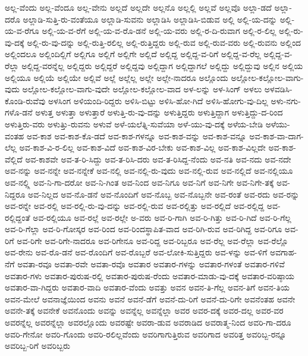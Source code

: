 {ಅಲ್ಲ-ವೆಂದು
ಅಲ್ಲ-ವೆಂದೂ
ಅಲ್ಲ-ವೇನು
ಅಲ್ಲದೆ
ಅಲ್ಲದೇ
ಅಲ್ಲನೊ
ಅಲ್ಲಲ್ಲಿ
ಅಲ್ಲವೆ
ಅಲ್ಲವೊ
ಅಲ್ಲಾ-ಡದೆ
ಅಲ್ಲಾ-ದರೊ
ಅಲ್ಲಾಡಿ-ಸುತ್ತಿ-ರು-ವಂತೆಯೂ
ಅಲ್ಲಾಡಿ-ಸುವನು
ಅಲ್ಲಾಡಿಸಿ
ಅಲ್ಲಾಡಿಸಿ-ಬಿಡುವ
ಅಲ್ಲಿ
ಅಲ್ಲಿ-ಯ-ದನ್ನು
ಅಲ್ಲಿ-ಯ-ವ-ರೆಗೂ
ಅಲ್ಲಿ-ಯ-ವ-ರೆಗೆ
ಅಲ್ಲಿ-ಯ-ವ-ರೊ-ಡನೆ
ಅಲ್ಲಿ-ಯ-ವರು
ಅಲ್ಲಿ-ರ-ದಿ-ರುವಾಗ
ಅಲ್ಲಿ-ರ-ಲಿಲ್ಲ
ಅಲ್ಲಿ-ರು-ವು-ದಕ್ಕೆ
ಅಲ್ಲಿ-ರು-ವು-ದನ್ನು
ಅಲ್ಲಿ-ರುತ್ತಿ-ರಲಿಲ್ಲ
ಅಲ್ಲಿ-ರುತ್ತಿದ್ದರು
ಅಲ್ಲಿ-ರುವ
ಅಲ್ಲಿ-ರುವ-ವರು
ಅಲ್ಲಿ-ರುವನು
ಅಲ್ಲಿಂದ
ಅಲ್ಲಿಂದಲೂ
ಅಲ್ಲಿಂದಿಲ್ಲಿಗೆ
ಅಲ್ಲಿಗೂ
ಅಲ್ಲಿಗೆ
ಅಲ್ಲಿಗೇ
ಅಲ್ಲಿದೆ
ಅಲ್ಲಿದ್ದ
ಅಲ್ಲಿದ್ದ-ವ-ರಿಗೆ
ಅಲ್ಲಿದ್ದ-ವ-ರೆಲ್ಲ
ಅಲ್ಲಿದ್ದ-ವ-ರೆಲ್ಲಾ
ಅಲ್ಲಿದ್ದ-ವರನ್ನೆಲ್ಲ
ಅಲ್ಲಿದ್ದರು
ಅಲ್ಲಿದ್ದರೆ
ಅಲ್ಲಿದ್ದವು
ಅಲ್ಲಿದ್ದಾಗ
ಅಲ್ಲಿದ್ದಾಗಲೆ
ಅಲ್ಲಿದ್ದು
ಅಲ್ಲಿದ್ದುವು
ಅಲ್ಲಿನ
ಅಲ್ಲಿಯ
ಅಲ್ಲಿಯೂ
ಅಲ್ಲಿಯೆ
ಅಲ್ಲಿಯೇ
ಅಲ್ಲಿವೆ
ಅಲ್ಲೆ
ಅಲ್ಲೆಲ್ಲ
ಅಲ್ಲೇ
ಅಲ್ಲೇ-ನಾದರೂ
ಅಲ್ಲೊಂದು
ಅಲ್ಲೋಲ-ಕಲ್ಲೋಲ-ವಾಗು-ವುದು
ಅಲ್ಲೋಲ-ಕಲ್ಲೋಲ-ವಾಗು-ವುದೇ
ಅಲ್ಲೋಲ-ಕಲ್ಲೋಲ-ವಾದ
ಅಳ-ಲನ್ನು
ಅಳ-ಸಿಂಗ್
ಅಳಲು
ಅಳವಡಿಸಿ-ಕೊಂಡಿ-ರುವೆವು
ಅಳಸಿಂಗ
ಅಳಿಯಂದಿ-ರಿದ್ದರು
ಅಳಿಸಿ-ಬಿಟ್ಟು
ಅಳಿಸಿ-ಹೋ-ಗಿದೆ
ಅಳಿಸಿ-ಹೋಗು-ವು-ದಿಲ್ಲ
ಅಳು-ನಗು-ಗಳೊ-ಡನೆ
ಅಳುತ್ತ
ಅಳುತ್ತಾ
ಅಳುತ್ತಾರೆ
ಅಳುತ್ತಿ-ರು-ವು-ದನ್ನು
ಅಳುತ್ತಿದ್ದರು
ಅಳುತ್ತಿದ್ದಾಗ
ಅಳುತ್ತಿದ್ದು-ದ-ರಿಂದ
ಅಳುತ್ತಿರು-ವರು
ಅಳುತ್ತಿು-ರುವನು
ಅಳುವೆ
ಅಳೆ-ಯಲೆತ್ನಿ-ಸುವೆಯಾ
ಅಳೆ-ಯು-ವು-ದಕ್ಕೆ
ಅಳೆಯ-ಬೇಡಿ
ಅಳೆಯು-ವಂತಹ
ಅವ-ಕಾಶ
ಅವ-ಕಾಶ-ಕೊ-ಡದೆ
ಅವ-ಕಾಶ-ಗಳನ್ನೂ
ಅವ-ಕಾಶ-ವನ್ನು
ಅವ-ಕಾಶ-ವನ್ನೂ
ಅವ-ಕಾಶ-ವಾ-ದಾಗ-ಲೆಲ್ಲ
ಅವ-ಕಾಶ-ವಿ-ರ-ಲಿಲ್ಲ
ಅವ-ಕಾಶ-ವಿದೆ
ಅವ-ಕಾಶ-ವಿರ-ಬೇಕು
ಅವ-ಕಾಶ-ವಿಲ್ಲ
ಅವ-ಕಾಶ-ವಿಲ್ಲದೇ
ಅವ-ಕಾಶ-ವೆಲ್ಲಿದೆ
ಅವ-ಕಾಶವೇ
ಅವ-ತ-ರಿ-ಸಿದ್ದು
ಅವ-ತ-ರಿಸಿ-ದರು
ಅವ-ತ-ರಿಸಿದ್ದ-ನೆಂದು
ಅವ-ನತಿ
ಅವ-ನದು
ಅವ-ನದೇ
ಅವ-ನನ್ನು
ಅವ-ನನ್ನೇ
ಅವ-ನನ್ನೇಕೆ
ಅವ-ನಲ್ಲಿ
ಅವ-ನಲ್ಲಿ-ರು-ವುದು
ಅವ-ನಲ್ಲಿ-ರುವ
ಅವ-ನಲ್ಲಿದೆ
ಅವ-ನಲ್ಲಿಯೂ
ಅವ-ನಲ್ಲ್ಲಿ
ಅವ-ನಿ-ಗಾ-ದರೋ
ಅವ-ನಿ-ಗಿಂತ
ಅವ-ನಿಂದ
ಅವ-ನಿಗೂ
ಅವ-ನಿಗೆ
ಅವ-ನಿಗೇ
ಅವ-ನಿಗೇ-ತಕ್ಕೆ
ಅವ-ನಿದ್ದರೂ
ಅವ-ನಿಲ್ಲದ
ಅವ-ನೊ-ಡನೆ
ಅವ-ನೊಂದಿಗೆ
ಅವ-ನೊಬ್ಬ
ಅವ-ನೊಬ್ಬನೇ
ಅವ-ರಂತೆ
ಅವ-ರದು
ಅವ-ರನ್ನು
ಅವ-ರನ್ನೇ
ಅವ-ರಲ್ಲಿ
ಅವ-ರಲ್ಲಿ-ರು-ವು-ದನ್ನು
ಅವ-ರಲ್ಲಿ-ರುವ
ಅವ-ರಲ್ಲಿತ್ತು
ಅವ-ರಲ್ಲಿದೆ
ಅವ-ರಲ್ಲಿದ್ದ
ಅವ-ರಲ್ಲಿದ್ದಂತೆ
ಅವ-ರಲ್ಲಿಯೂ
ಅವ-ರಲ್ಲೆ
ಅವ-ರಲ್ಲೇ
ಅ-ವರು
ಅವ-ರಿ-ಗಾಗಿ
ಅವ-ರಿ-ಗಿತ್ತು
ಅವ-ರಿ-ಗಿದೆ
ಅವ-ರಿ-ಗೆಲ್ಲ
ಅವ-ರಿ-ಗೆಲ್ಲಾ
ಅವ-ರಿ-ಗೋಸ್ಕರ
ಅವ-ರಿಂದ
ಅವ-ರಿಂದಸ್ಥಾಪಿತ-ವಾದ
ಅವ-ರಿಗಿ-ರುವ
ಅವ-ರಿಗಿದ್ದ
ಅವ-ರಿಗೂ
ಅವ-ರಿಗೆ
ಅವ-ರಿಗೇ
ಅವ-ರಿಗೇ-ನಾದರೂ
ಅವ-ರಿಗೇನೂ
ಅವ-ರಿದ್ದ
ಅವ-ರಿಬ್ಬರೂ
ಅವ-ರೆಲ್ಲ
ಅವ-ರೆಲ್ಲಾ
ಅವ-ರೆಲ್ಲೊ
ಅವ-ರೇನು
ಅವ-ರೊ-ಡನೆ
ಅವ-ರೊಂದಿಗೆ
ಅವ-ರೊಬ್ಬರೆ
ಅವ-ಲೋಕಿ-ಸುತ್ತಿದ್ದರು
ಅವ-ಳನ್ನು
ಅವ-ಳಿಗೆ
ಅವಗಾಹ-ನೆಗೆ
ಅವತಾ-ರವೂ
ಅವತಾ-ರವೇ
ಅವತಾ-ರವೊ
ಅವತಾರ
ಅವತಾರ-ಗಳನ್ನು
ಅವತಾರ-ಗಳಂತೆ
ಅವತಾರ-ಗಳಿವೆ
ಅವತಾರ-ಗಳು
ಅವತಾರ-ಪುರುಷ-ರಲ್ಲಿ
ಅವತಾರ-ಪುರುಷ-ರೆಂದು
ಅವತಾರ-ಮಾಡು-ವು-ದಕ್ಕೆ
ಅವತಾರ-ವರಿಷ್ಠಾಯ
ಅವತಾರ-ವಾ-ಗಿದ್ದರು
ಅವತಾರ-ವಾದಿ
ಅವತಾರ-ವೆಂದು
ಅವತ್ತು
ಅವನ
ಅವನ-ತಿ-ಗೆಲ್ಲ
ಅವನ-ತಿಗೆ
ಅವನ-ತಿಯ
ಅವನ-ಮೇಲೆ
ಅವನಾಜ್ಞೆಯಿಂದ
ಅವನು
ಅವನೆ
ಅವನೆ-ಡೆಗೆ
ಅವನೆ-ದು-ರಿಗೆ
ಅವನೆ-ದು-ರಿಗೇ
ಅವನೆಂತಹ
ಅವನೇ
ಅವನೇ-ತಕ್ಕೆ
ಅವನೇಕೆ
ಅವನೊಂದು
ಅವನ್ನು
ಅವನ್ನೆಲ್ಲ
ಅವನ್ನೆಲ್ಲಾ
ಅವರ
ಅವರ-ದಕ್ಕೆ
ಅವರ-ದಲ್ಲ
ಅವರ-ವರ
ಅವರನ್ನೆಲ್ಲ
ಅವರನ್ನೆಲ್ಲಾ
ಅವರಲ್ಲೊಂದು
ಅವರಷ್ಟೇ
ಅವರಾ-ಡುವ
ಅವರಾಡಿದ
ಅವರಾತ್ಮ-ನಿಂದ
ಅವರಿ-ಗಾ-ದರೂ
ಅವರಿ-ಗೇನೋ
ಅವರಿ-ಗೊಂದು
ಅವರಿ-ರಲಿಲ್ಲವೆಂದು
ಅವರಿಗಾಗುತ್ತಿರುವ
ಅವರಿಗಾದ
ಅವರಿತ್ತ
ಅವರಿಬ್ಬ-ರನ್ನೂ
ಅವರಿಬ್ಬ-ರಿಗೆ
ಅವರಿಬ್ಬರು
}
